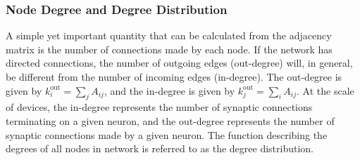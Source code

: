 \documentclass[twocolumn]{article}
\begin{document}
\subsubsection{Node Degree and Degree Distribution}
A simple yet important quantity that can be calculated from the adjacency matrix is the number of connections made by each node. If the network has directed connections, the number of outgoing edges (out-degree) will, in general, be different from the number of incoming edges (in-degree). The out-degree is given by $k^{\mathrm{out}}_i = \sum_jA_{ij}$, and the in-degree is given by $k^{\mathrm{out}}_j = \sum_iA_{ij}$. At the scale of devices, the in-degree represents the number of synaptic connections terminating on a given neuron, and the out-degree represents the number of synaptic connections made by a given neuron. The function describing the degrees of all nodes in network is referred to as the degree distribution.
\end{document}
